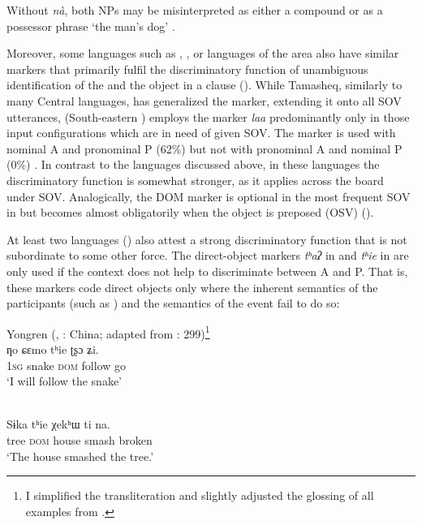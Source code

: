 \documentclass[output=paper]{langsci/langscibook}
\begin{document}
Without \textit{nà}, both NPs may be misinterpreted as either a compound or as a possessor phrase ‘the man’s dog’ \citep[91]{Heath2007}.

Moreover, some  languages such as , ,  or  languages of the area also have similar markers that primarily fulfil the discriminatory function of unambiguous identification of the  and the object in a clause (\citealt{Heath2007,CreisselsDiagne2013,Nikitina2018}). While Tamasheq, similarly to many Central  languages, has generalized the marker, extending it onto all SOV utterances,  (South-eastern ) employs the marker \textit{laa} predominantly only in those input configurations which are in need of  given SOV. The marker is used with nominal A and pronominal P (62\%) but not with pronominal A and nominal P (0\%) \citep[202]{Nikitina2018}. In contrast to the languages discussed above, in these languages the discriminatory function is somewhat stronger, as it applies across the board under SOV. Analogically, the DOM marker is optional in the most frequent SOV  in  but becomes almost obligatorily when the object is preposed (OSV) (\citealt{AhnCho2007}).

At least two  languages () also attest a strong discriminatory function that is not subordinate to some other force. The direct-object markers \textit{tʰ}\textit{aʔ} in  and \textit{tʰ}\textit{ie} in  are only used if the context does not help to discriminate between A and P. That is, these markers code direct objects only where the inherent semantics of the participants (such as ) and the semantics of the event fail to do so:

\ea\label{ex:serzant:25}
Yongren  (, : China; adapted from \citealt{Gerner2008}: 299)\footnote{I simplified the transliteration and slightly adjusted the glossing of all examples from \citet{Gerner2008}.}\\
\gll ƞo   ɕεmo   tʰie   ʈʂɔ   ʑi.\\
     1\textsc{sg}  snake  \textsc{dom}  follow  go\\
\glt ‘I will follow the snake’
\z

\ea\label{ex:serzant:26}
\\
\gll Sɨka   tʰie   χekʰɯ   ti   na.\\
     tree  \textsc{dom}  house  smash  broken\\
\glt ‘The house smashed the tree.’
\z
\end{document}

